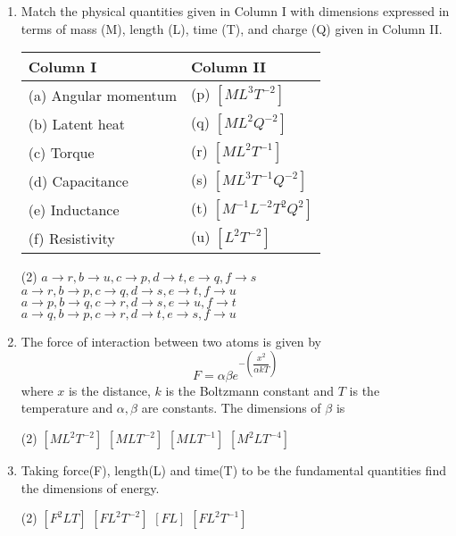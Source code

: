 \documentclass{article}
\renewcommand{\ans}{\quad}
\begin{document}
\begin{enumerate}
    \item Match the physical quantities given in Column I with dimensions expressed in terms of mass
    (M), length (L), time (T), and charge (Q) given in Column II.
        \begin{table}[h]
            \begin{center}
            \begin{tabular}{p{5cm}|p{3cm}}
            \hline
            Column I & Column II \\
            \hline
            (a) Angular momentum & (p) $[ML^3T^{-2}]$ \\
            (b) Latent heat & (q) $[ML^{2}Q^{-2}]$ \\
            (c) Torque & (r) $[ML^2T^{-1}]$ \\
            (d) Capacitance & (s) $[ML^3T^{-1}Q^{-2}]$ \\
            (e) Inductance & (t) $[M^{-1}L^{-2}T^{2}Q^{2}]$ \\
            (f) Resistivity & (u) $[L^2T^{-2}]$ \\
            \hline
            \end{tabular}
            \end{center}
        \end{table}
        \begin{tasks}(2)
            \task $a \rightarrow r, b \rightarrow u, c \rightarrow p, d \rightarrow t, e \rightarrow q, f \rightarrow s$\ans
            \task $a \rightarrow r, b \rightarrow p, c \rightarrow q, d \rightarrow s, e \rightarrow t, f \rightarrow u$
            \task $a \rightarrow p, b \rightarrow q, c \rightarrow r, d \rightarrow s, e \rightarrow u, f \rightarrow t$
            \task $a \rightarrow q, b \rightarrow p, c \rightarrow r, d \rightarrow t, e \rightarrow s, f \rightarrow u$
        \end{tasks}

        

    \item The force of interaction between two atoms is given by \[ F=\alpha \beta e^{-\left(\dfrac{x^2}{\alpha k T}\right)} \] where $x$ is the distance, $k$ is the Boltzmann constant and $T$ is the temperature and $\alpha, \beta$ are constants. The dimensions of $\beta$ is 
    \begin{tasks}(2)
        \task $[ML^2T^{-2}]$
        \task $[MLT^{-2}]$
        \task $[MLT^{-1}]$
        \task $[M^2LT^{-4}]$\ans
    \end{tasks}

    \item Taking force(F), length(L) and time(T) to be the fundamental quantities find the dimensions of energy.
    \begin{tasks}(2)
        \task $[F^2LT]$
        \task $[FL^2T^{-2}]$
        \task $[FL]$\ans
        \task $[FL^2T^{-1}]$
    \end{tasks}

\end{enumerate}


\pagebreak


\end{document}
